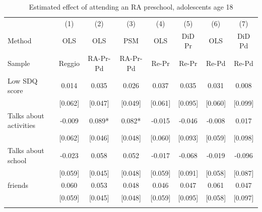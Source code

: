 \documentclass[12pt]{article}
\begin{document}
\begin{table}[ht]
\caption{Estimated effect of attending an RA preschool, adolescents age 18}
\label{tab:adoPS}
\begin{center}
\begin{adjustbox}{width=1.2\textwidth,center=\textwidth}
\small
\begin{tabular}{lccccccc}
\hline 
 & {(1) } & {(2) } & {(3) } & {(4) } & {(5) } & {(6) } & {(7) }\\
{Method } & {OLS } & {OLS } & {PSM } & {OLS } & {DiD Pr } & {OLS } & {DiD Pd }\\
{Sample } & {Reggio } & {RA-Pr-Pd } & {RA-Pr-Pd } & {Re-Pr } & {Re-Pr } & {Re-Pd } & {Re-Pd }\\
\hline 
{Low SDQ score } & {0.014 } & {0.035 } & {0.026 } & {0.037 } & {0.035 } & {0.031 } & {0.008 }\\
 & [0.062] & [0.047] & [0.049] & [0.061] & [0.095] & [0.060] & [0.099]\\
{Talks about activities } & {-0.009 } & {0.089{*} } & {0.082{*} } & {-0.015 } & {-0.046 } & {-0.008 } & {0.017 }\\
 & [0.062] & [0.046] & [0.048] & [0.060] & [0.093] & [0.059] & [0.098]\\
{Talks about school } & {-0.023 } & {0.058 } & {0.052 } & {-0.017 } & {-0.068 } & {-0.019 } & {-0.096 }\\
 & [0.059] & [0.045] & [0.048] & [0.059] & [0.091] & [0.058] & [0.087]\\
{%
friends } & {0.060 } & {0.053 } & {0.048 } & {0.046 } & {0.047 } & {0.061 } & {0.047 }\\
 & [0.059] & [0.045] & [0.048] & [0.059] & [0.095] & [0.058] & [0.097]\\
{%
}
\end{tabular}
\end{adjustbox}
\end{center}
\end{table}
\end{document}
